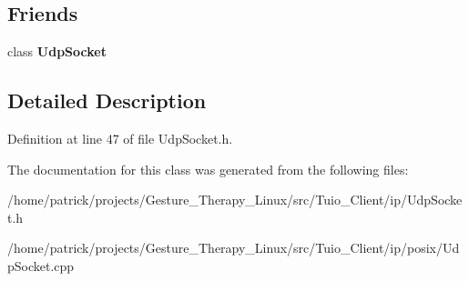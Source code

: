 \subsection*{Friends}
\begin{DoxyCompactItemize}
\item 
\mbox{\label{class_socket_receive_multiplexer_ae128c6687ced82c6157c5f865f8dec5c}} 
class {\bfseries Udp\+Socket}
\end{DoxyCompactItemize}


\subsection{Detailed Description}


Definition at line 47 of file Udp\+Socket.\+h.



The documentation for this class was generated from the following files\+:\begin{DoxyCompactItemize}
\item 
/home/patrick/projects/\+Gesture\+\_\+\+Therapy\+\_\+\+Linux/src/\+Tuio\+\_\+\+Client/ip/Udp\+Socket.\+h\item 
/home/patrick/projects/\+Gesture\+\_\+\+Therapy\+\_\+\+Linux/src/\+Tuio\+\_\+\+Client/ip/posix/Udp\+Socket.\+cpp\end{DoxyCompactItemize}
